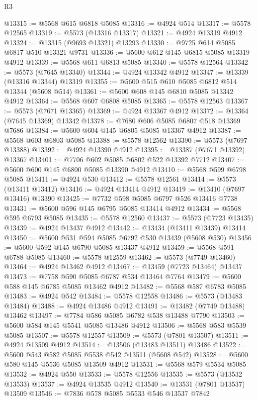 \begin{lexlean}{R3}
\begin{coremodule}
@13315 := @5568 @615 @6818 @5085
@13316 := @4924 @514
@13317 := @5578 @12565
@13319 := @5573 (@13316 @13317)
@13321 := @4924 @13319 @4912
@13324 := @13315 (@9693 @13321) @13293
@13330 := @9725 @614 @5085 @6817 @510 @13321 @9731
@13336 := @5600 @612 @145 @6815 @5085 @13319 @4912
@13339 := @5568 @611 @6813 @5085
@13340 := @5578 @12564
@13342 := @5573 (@7645 @13340)
@13344 := @4924 @13342 @4912
@13347 := @13339 (@13316 @13344) @13319
@13355 := @5600 @515 @610 @5085 @6812 @514 @13344 (@5608 @514)
@13361 := @5600 @608 @145 @6810 @5085 @13342 @4912
@13364 := @5568 @607 @6808 @5085
@13365 := @5578 @12563
@13367 := @5573 (@7671 @13365)
@13369 := @4924 @13367 @4912
@13372 := @13364 (@7645 @13369) @13342
@13378 := @7680 @606 @5085 @6807 @518 @13369 @7686
@13384 := @5600 @604 @145 @6805 @5085 @13367 @4912
@13387 := @5568 @603 @6803 @5085
@13388 := @5578 @12562
@13390 := @5573 (@7697 @13388)
@13392 := @4924 @13390 @4912
@13395 := @13387 (@7671 @13392) @13367
@13401 := @7706 @602 @5085 @6802 @522 @13392 @7712
@13407 := @5600 @600 @145 @6800 @5085 @13390 @4912
@13410 := @5568 @599 @6798 @5085
@13411 := @4924 @530
@13412 := @5578 @12561
@13414 := @5573 (@13411 @13412)
@13416 := @4924 @13414 @4912
@13419 := @13410 (@7697 @13416) @13390
@13425 := @7732 @598 @5085 @6797 @526 @13416 @7738
@13431 := @5600 @596 @145 @6795 @5085 @13414 @4912
@13434 := @5568 @595 @6793 @5085
@13435 := @5578 @12560
@13437 := @5573 (@7723 @13435)
@13439 := @4924 @13437 @4912
@13442 := @13434 (@13411 @13439) @13414
@13450 := @5600 @531 @594 @5085 @6792 @530 @13439 (@5608 @530)
@13456 := @5600 @592 @145 @6790 @5085 @13437 @4912
@13459 := @5568 @591 @6788 @5085
@13460 := @5578 @12559
@13462 := @5573 (@7749 @13460)
@13464 := @4924 @13462 @4912
@13467 := @13459 (@7723 @13464) @13437
@13473 := @7758 @590 @5085 @6787 @534 @13464 @7764
@13479 := @5600 @588 @145 @6785 @5085 @13462 @4912
@13482 := @5568 @587 @6783 @5085
@13483 := @4924 @542
@13484 := @5578 @12558
@13486 := @5573 (@13483 @13484)
@13488 := @4924 @13486 @4912
@13491 := @13482 (@7749 @13488) @13462
@13497 := @7784 @586 @5085 @6782 @538 @13488 @7790
@13503 := @5600 @584 @145 @5541 @5085 @13486 @4912
@13506 := @5568 @583 @5539 @5085
@13507 := @5578 @12557
@13509 := @5573 (@7801 @13507)
@13511 := @4924 @13509 @4912
@13514 := @13506 (@13483 @13511) @13486
@13522 := @5600 @543 @582 @5085 @5538 @542 @13511 (@5608 @542)
@13528 := @5600 @580 @145 @5536 @5085 @13509 @4912
@13531 := @5568 @579 @5534 @5085
@13532 := @4924 @550
@13533 := @5578 @12556
@13535 := @5573 (@13532 @13533)
@13537 := @4924 @13535 @4912
@13540 := @13531 (@7801 @13537) @13509
@13546 := @7836 @578 @5085 @5533 @546 @13537 @7842

\end{coremodule}
\end{lexlean}
